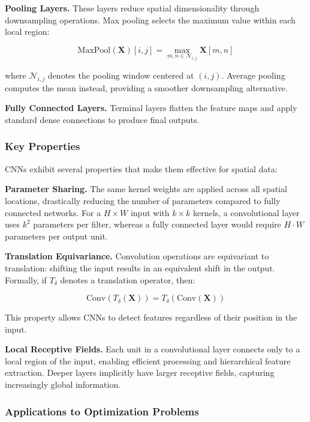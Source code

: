 \textbf{Pooling Layers.} These layers reduce spatial dimensionality through downsampling operations. Max pooling selects the maximum value within each local region:

\begin{equation}
\text{MaxPool}(\mathbf{X})[i,j] = \max_{m,n \in \mathcal{N}_{i,j}} \mathbf{X}[m,n]
\end{equation}

where $\mathcal{N}_{i,j}$ denotes the pooling window centered at $(i,j)$. Average pooling computes the mean instead, providing a smoother downsampling alternative.

\textbf{Fully Connected Layers.} Terminal layers flatten the feature maps and apply standard dense connections to produce final outputs.

\subsubsection{Key Properties}

CNNs exhibit several properties that make them effective for spatial data:

\textbf{Parameter Sharing.} The same kernel weights are applied across all spatial locations, drastically reducing the number of parameters compared to fully connected networks. For a $H \times W$ input with $k \times k$ kernels, a convolutional layer uses $k^2$ parameters per filter, whereas a fully connected layer would require $H \cdot W$ parameters per output unit.

\textbf{Translation Equivariance.} Convolution operations are equivariant to translation: shifting the input results in an equivalent shift in the output. Formally, if $T_{\delta}$ denotes a translation operator, then:

\begin{equation}
\text{Conv}(T_{\delta}(\mathbf{X})) = T_{\delta}(\text{Conv}(\mathbf{X}))
\end{equation}

This property allows CNNs to detect features regardless of their position in the input.

\textbf{Local Receptive Fields.} Each unit in a convolutional layer connects only to a local region of the input, enabling efficient processing and hierarchical feature extraction. Deeper layers implicitly have larger receptive fields, capturing increasingly global information.

\subsubsection{Applications to Optimization Problems}

